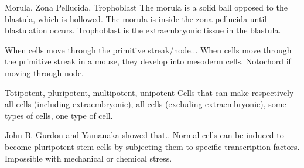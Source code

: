 
\begin{flashcard}{Morula, Zona Pellucida, Trophoblast}
    The morula is a solid ball opposed to the blastula, which is hollowed. The morula is inside the zona pellucida until blastulation occurs. Trophoblast is the extraembryonic tissue in the blastula.
\end{flashcard}

\begin{flashcard}{When cells move through the primitive streak/node...}
    When cells move through the primitive streak in a mouse, they develop into mesoderm cells. Notochord if moving through node.
\end{flashcard}

\begin{flashcard}{Totipotent, pluripotent, multipotent, unipotent}
    Cells that can make respectively all cells (including extraembryonic), all cells (excluding extraembryonic), some types of cells, one type of cell.
\end{flashcard}


\begin{flashcard}[Experiment]{John B. Gurdon and Yamanaka showed that..}
    Normal cells can be induced to become pluripotent stem cells by subjecting them to specific transcription factors. Impossible with mechanical or chemical stress.
\end{flashcard}
